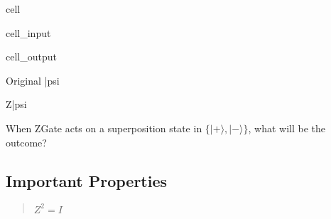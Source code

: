 \documentclass[letterpaper,10pt,english]{jupyterBook}
\begin{document}
\begin{sphinxuseclass}{cell}
\begin{sphinxVerbatimInput}
\begin{sphinxuseclass}{cell_input}
\begin{sphinxVerbatim}[commandchars=\\\{\}]
   

  
  

   

\end{sphinxVerbatim}

\end{sphinxuseclass}\end{sphinxVerbatimInput}
\begin{sphinxVerbatimOutput}

\begin{sphinxuseclass}{cell_output}
\begin{sphinxVerbatim}[commandchars=\\\{\}]
\PYGZsq{}Original |psi\PYGZgt{}\PYGZsq{}
\end{sphinxVerbatim}

\noindent{}

\begin{sphinxVerbatim}[commandchars=\\\{\}]
\PYGZsq{}Z|psi\PYGZgt{}\PYGZsq{}
\end{sphinxVerbatim}

\noindent{}

\end{sphinxuseclass}\end{sphinxVerbatimOutput}

\end{sphinxuseclass}
\sphinxAtStartPar
When ZGate acts on a superposition state in \(\{|+\rangle,|-\rangle\}\), what will be the outcome?


\subsection{Important Properties}
\label{\detokenize{q1gates/z:important-properties}}\begin{quote}

\sphinxAtStartPar
\(Z^2 = I\)
\end{quote}
\end{document}
